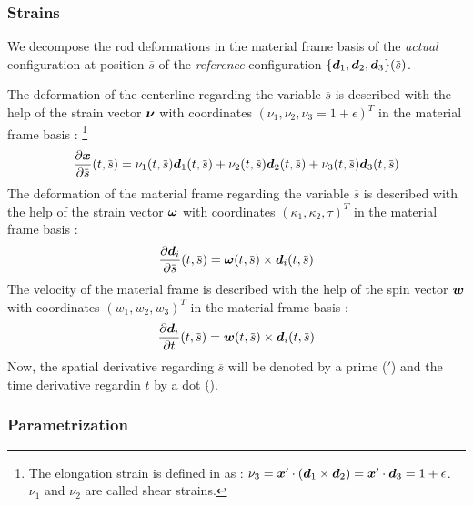 \subsubsection{Strains}

We decompose the rod deformations in the material frame basis of the \emph{actual} configuration at position $\overbar{s}$ of the \emph{reference} configuration $\{\vect{d}_1, \vect{d}_2, \vect{d}_3\}(\overbar{s})$.

The deformation of the centerline regarding the variable $\overbar{s}$ is described with the help of the strain vector $\boldsymbol{\nu}$ with coordinates $(\nu_1, \nu_2, \nu_3 = 1 + \epsilon)^T$ in the material frame basis : \footnote{The elongation strain is defined in \cite[pp.~283]{Antman2005} as : $\nu_3 = \boldsymbol{x}' \cdot (\boldsymbol{d}_1 \times \boldsymbol{d}_2) =  \boldsymbol{x}' \cdot \boldsymbol{d}_3 = 1+\epsilon$. $\nu_1$ and $\nu_2$ are called shear strains.}
\begin{equation}
		\frac{\partial \vect{x}}{\partial \overbar{s}} (t, \overbar{s})  = {\nu_1}(t, \overbar{s}) \vect{d}_1(t, \overbar{s})
		+ {\nu_2}(t, \overbar{s}) \vect{d}_2(t, \overbar{s})
		+ {\nu_3}(t, \overbar{s}) \vect{d}_3(t, \overbar{s})
\end{equation}
The deformation of the material frame regarding the variable $\overbar{s}$ is described with the help of the strain vector $\boldsymbol{\omega}$ with coordinates $(\kappa_1, \kappa_2, \tau)^T$ in the material frame basis :
\begin{equation}	
		\frac{\partial \vect{d}_i}{\partial \overbar{s}} (t, \overbar{s}) = \vect{\omega}(t, \overbar{s}) \times  \vect{d}_i (t, \overbar{s})
\end{equation}
The velocity of the material frame is described with the help of the spin vector $\boldsymbol{w}$ with coordinates $(w_1, w_2, w_3)^T$ in the material frame basis :
\begin{equation}	
		\frac{\partial \vect{d}_i}{\partial t} (t, \overbar{s}) = \vect{w}(t, \overbar{s}) \times  \vect{d}_i (t, \overbar{s})
\end{equation}
Now, the spatial derivative regarding $\overbar{s}$ will be denoted by a prime (${}'$) and the time derivative regardin $t$ by a dot ($\dot{}$).

\subsubsection{Parametrization}

